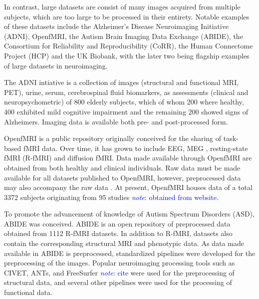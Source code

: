 \documentclass{report}
\newcommand{\note}[1]{\textcolor{blue}{\textit{note}: #1}}
\begin{document}
            In contrast, large datasets are consist of many images acquired from
            multiple subjects, which are too large to be processed in their
            entirety. Notable examples of these datasets include the 
            Alzheimer's Disease Neuroimaging Initiative (ADNI), OpenfMRI, 
            the Autism Brain Imaging Data Exchange (ABIDE), the Consortium for
            Reliability and Reproducibility (CoRR), the Human Connectome Project
            (HCP) and the UK Biobank, with the later
            two being flagship examples of large datasets in neuroimaging.

            The ADNI intiative is a collection of images (structural and 
            functional MRI, PET), urine,
            serum, cerebrospinal fluid biomarkers, as assessments (clinical and
            neuropsychometric) of 800 elderly subjects, which of whom 200 where
            healthy, 400 exhibited mild cognitive impairment and the remaining
            200 showed signs of Alzheimers. Imaging data is available both 
            pre- and post-processed form.

            OpenfMRI is a public repository originally conceived for the sharing
            of task-based fMRI data. Over time, it has grown to include EEG, MEG
            , resting-state fMRI (R-fMRI) and diffusion fMRI. Data made 
            available through
            OpenfMRI are obtained from both healthy and clinical individuals.
            Raw data must be made available for all datasets published to 
            OpenfMRI, however, preprocessed data may also accompany the raw data
            . At present, OpenfMRI houses data of a total 3372 subjects
            originating from 95 studies \note{obtained from website}.

            To promote the advancement of knowledge of Autism Spectrum Disorders
            (ASD), ABIDE was conceived. ABIDE is an open repository of 
            preprocessed data obtained from 1112 R-fMRI datasets.
            In addition to R-fMRI, datasets also contain the corresponding 
            structural MRI and phenotypic data. As data made available in ABIDE
            is preprocessed, standardized pipelines were developed for the 
            preprocessing of the images. Popular neuroimaging processing tools
            such as CIVET, ANTs, and FreeSurfer \note{cite} were used for the 
            preprocessing of structural data, and several other pipelines were
            used for the processing of functional data.
\end{document}
